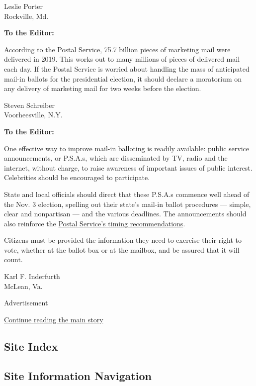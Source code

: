 Leslie Porter\\
Rockville, Md.

\textbf{To the Editor:}

According to the Postal Service, 75.7 billion pieces of marketing mail
were delivered in 2019. This works out to many millions of pieces of
delivered mail each day. If the Postal Service is worried about handling
the mass of anticipated mail-in ballots for the presidential election,
it should declare a moratorium on any delivery of marketing mail for two
weeks before the election.

Steven Schreiber\\
Voorheesville, N.Y.

\textbf{To the Editor:}

One effective way to improve mail-in balloting is readily available:
public service announcements, or P.S.A.s, which are disseminated by TV,
radio and the internet, without charge, to raise awareness of important
issues of public interest. Celebrities should be encouraged to
participate.

State and local officials should direct that these P.S.A.s commence well
ahead of the Nov. 3 election, spelling out their state's mail-in ballot
procedures --- simple, clear and nonpartisan --- and the various
deadlines. The announcements should also reinforce the
\href{https://about.usps.com/newsroom/national-releases/2020/0529-usps-provides-recommendations-for-successful-2020-election-mail-season.htm}{Postal
Service's timing recommendations}.

Citizens must be provided the information they need to exercise their
right to vote, whether at the ballot box or at the mailbox, and be
assured that it will count.

Karl F. Inderfurth\\
McLean, Va.

Advertisement

\protect\hyperlink{after-bottom}{Continue reading the main story}

\hypertarget{site-index}{%
\subsection{Site Index}\label{site-index}}

\hypertarget{site-information-navigation}{%
\subsection{Site Information
Navigation}\label{site-information-navigation}}

